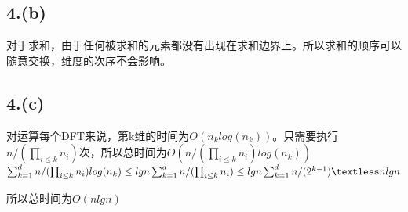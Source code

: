 \documentclass{article}
\begin{document}
	\subsection*{4.(b)}
	\par{对于求和，由于任何被求和的元素都没有出现在求和边界上。所以求和的顺序可以随意交换，维度的次序不会影响。}
	\subsection*{4.(c)}
	\par{对运算每个DFT来说，第k维的时间为$O(n_{k}log(n_{k}))$。只需要执行$n/(\prod_{i\le k}^{}n_{i})$次，所以总时间为$O(n/(\prod_{i\le k}^{}n_{i})log(n_{k}))$}\\
	$ \sum_{k=1}^{d}n/(\prod_{i\le k}^{}n_{i})log(n_{k})\le lgn\sum_{k=1}^{d}n/(\prod_{i\le k}^{}n_{i})\le lgn\sum_{k=1}^{d}n/(2^{k-1})\textless nlgn $
	\par{所以总时间为$O(nlgn)$}
\end{document}
